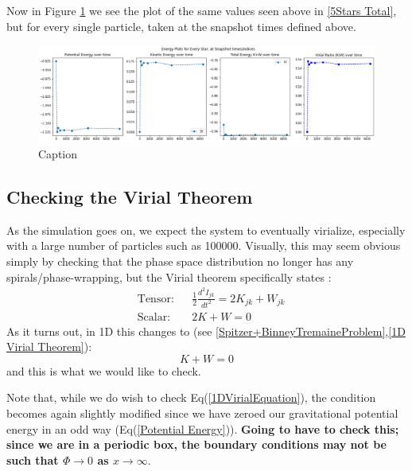 \documentclass[oneside]{book}
\begin{document}
Now in Figure \ref{All Total Energies} we see the plot of the same values seen above in  \ref{5Stars Total}, but for every single particle, taken at the snapshot times defined above.
\begin{figure}[h]
    \centering
    \includegraphics[width=\textwidth]{Images/AllTotal.png}
    \caption{Caption}
    \label{All Total Energies}
\end{figure}

\subsection{Checking the Virial Theorem}
As the simulation goes on, we expect the system to eventually virialize, especially with a large number of particles such as 100000. Visually, this may seem obvious simply by checking that the phase space distribution no longer has any spirals/phase-wrapping, but the Virial theorem specifically states \cite{Binney&Tremaine}:
\begin{align}
    &\text{Tensor:} && \frac{1}{2}\frac{d^2 I_{jk}}{dt^2} = 2K_{jk} + W_{jk} \\
    &\text{Scalar:} && 2K+W=0
\end{align}
As it turns out, in 1D this changes to (see \cref{Spitzer+BinneyTremaineProblem},\cref{1D Virial Theorem}):
\begin{equation}
    K+W=0
    \label{1DVirialEquation}
\end{equation}
and this is what we would like to check.

Note that, while we do wish to check Eq(\ref{1DVirialEquation}), the condition becomes again slightly modified since we have zeroed our gravitational potential energy in an odd way (Eq(\ref{Potential Energy})). {\color{red}\textbf{Going to have to check this; since we are in a periodic box, the boundary conditions may not be such that $\Phi \rightarrow 0$ as $x \rightarrow \infty$}.}
\end{document}

